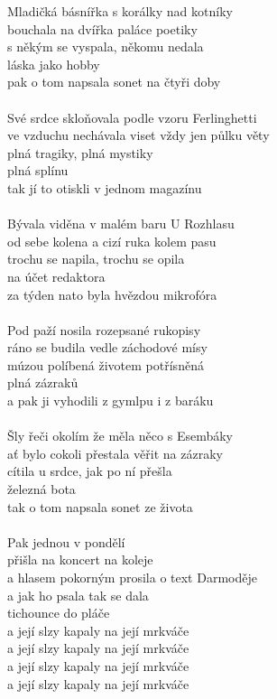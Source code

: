\begin{multicols}{2}
Mladičká básnířka s korálky nad kotníky\\
bouchala na dvířka paláce poetiky\\
s někým se vyspala, někomu nedala\\
láska jako hobby\\
pak o tom napsala sonet na čtyři doby\\
\\
Své srdce skloňovala podle vzoru Ferlinghetti\\
ve vzduchu nechávala viset vždy jen půlku věty\\
plná tragiky, plná mystiky\\
plná splínu\\
tak jí to otiskli v jednom magazínu\\
\\
Bývala viděna v malém baru U Rozhlasu\\
od sebe kolena a cizí ruka kolem pasu\\
trochu se napila, trochu se opila\\
na účet redaktora\\
za týden nato byla hvězdou mikrofóra\\
\\
Pod paží nosila rozepsané rukopisy\\
ráno se budila vedle záchodové mísy\\
múzou políbená životem potřísněná\\
plná zázraků\\
a pak ji vyhodili z gymlpu i z baráku\\
\columnbreak
\\
Šly řeči okolím že měla něco s Esembáky\\
ať bylo cokoli přestala věřit na zázraky\\
cítila u srdce, jak po ní přešla\\
železná bota\\
tak o tom napsala sonet ze života\\
\\
Pak jednou v pondělí\\
přišla na koncert na koleje\\
a hlasem pokorným prosila o text Darmoděje\\
a jak ho psala tak se dala\\
tichounce do pláče\\
a její slzy kapaly na její mrkváče\\
a její slzy kapaly na její mrkváče\\
a její slzy kapaly na její mrkváče\\
a její slzy kapaly na její mrkváče\\
\end{multicols}
